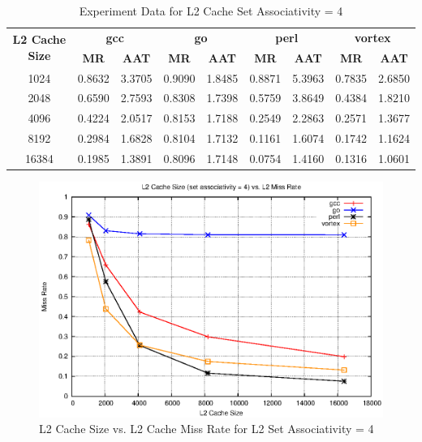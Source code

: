 \documentclass[a4paper]{article}
\begin{document}

\begin{table}[htbp]
    \centering
    \begin{tabular}{|c|c|c|c|c|c|c|c|c|}
        \hline
        \multirow{2}[4]{*}{\bf L2 Cache Size} & \multicolumn{2}{c|}{\bf gcc} & \multicolumn{2}{c|}{\bf go} & \multicolumn{2}{c|}{\bf perl}          &\multicolumn{2}{c|}{\bf vortex}\\
        \cline{2-9} & \bf MR & \bf AAT & \bf MR & \bf AAT & \bf MR & \bf AAT & \bf MR & \bf AAT \\
        \hline
        1024 & 0.8632 & 3.3705 & 0.9090 & 1.8485 & 0.8871 & 5.3963 & 0.7835 & 2.6850 \\
        2048 & 0.6590 & 2.7593 & 0.8308 & 1.7398 & 0.5759 & 3.8649 & 0.4384 & 1.8210 \\
        4096 & 0.4224 & 2.0517 & 0.8153 & 1.7188 & 0.2549 & 2.2863 & 0.2571 & 1.3677 \\
        8192 & 0.2984 & 1.6828 & 0.8104 & 1.7132 & 0.1161 & 1.6074 & 0.1742 & 1.1624 \\
        16384 & 0.1985 & 1.3891 & 0.8096 & 1.7148 & 0.0754 & 1.4160 & 0.1316 & 1.0601 \\
        \hline
    \end{tabular}
    \captionsetup{justification=centering}
    \caption{Experiment Data for L2 Cache Set Associativity = 4}
    \label{tab:l2mr_data_sa4}
\end{table}

\begin{figure}
    \centering
    \includegraphics[scale=1.3] {l2_sa_4.eps}
    \captionsetup{justification=centering}
    \caption{L2 Cache Size vs. L2 Cache Miss Rate for L2 Set Associativity = 4}
    \label{fig:l2mr_graph_sa4}
\end{figure}
\end{document}
